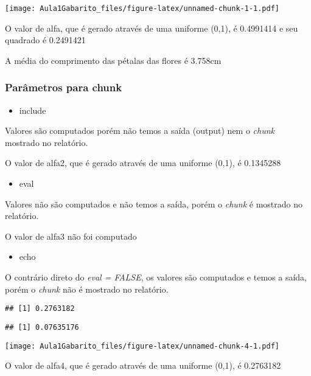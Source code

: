 \documentclass[
]{article}
\newenvironment{Shaded}{\begin{snugshade}}{\end{snugshade}}
\newcommand{\DecValTok}[1]{\textcolor[rgb]{0.00,0.00,0.81}{#1}}
\newcommand{\FunctionTok}[1]{\textcolor[rgb]{0.13,0.29,0.53}{\textbf{#1}}}
\newcommand{\NormalTok}[1]{#1}
\newcommand{\OtherTok}[1]{\textcolor[rgb]{0.56,0.35,0.01}{#1}}
\newcommand{\SpecialCharTok}[1]{\textcolor[rgb]{0.81,0.36,0.00}{\textbf{#1}}}
\providecommand{\tightlist}{%
  \setlength{\itemsep}{0pt}\setlength{\parskip}{0pt}}
\begin{document}
\texttt{[image: Aula1Gabarito\_files/figure-latex/unnamed-chunk-1-1.pdf]}

O valor de alfa, que é gerado através de uma uniforme (0,1), é 0.4991414
e seu quadrado é 0.2491421

A média do comprimento das pétalas das flores é 3.758cm

\subsubsection{Parâmetros para chunk}\label{paruxe2metros-para-chunk}

\begin{itemize}
\tightlist
\item
  include
\end{itemize}

Valores são computados porém não temos a saída (output) nem o
\emph{chunk} mostrado no relatório.

O valor de alfa2, que é gerado através de uma uniforme (0,1), é
0.1345288

\begin{itemize}
\tightlist
\item
  eval
\end{itemize}

Valores não são computados e não temos a saída, porém o \emph{chunk} é
mostrado no relatório.

\begin{Shaded}
\end{Shaded}

O valor de alfa3 não foi computado

\begin{itemize}
\tightlist
\item
  echo
\end{itemize}

O contrário direto do \emph{eval = FALSE}, os valores são computados e
temos a saída, porém o \emph{chunk} não é mostrado no relatório.

\begin{verbatim}
## [1] 0.2763182
\end{verbatim}

\begin{verbatim}
## [1] 0.07635176
\end{verbatim}

\texttt{[image: Aula1Gabarito\_files/figure-latex/unnamed-chunk-4-1.pdf]}

O valor de alfa4, que é gerado através de uma uniforme (0,1), é
0.2763182
\end{document}
